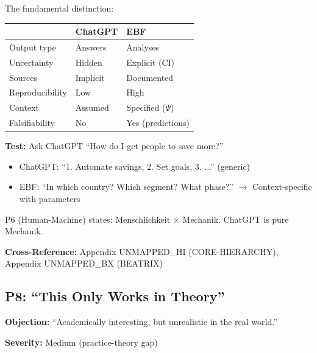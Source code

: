 \begin{axiom}
The fundamental distinction:

\begin{center}
\begin{tabular}{lll}
& \textbf{ChatGPT} & \textbf{EBF} \\
\midrule
Output type & Answers & Analyses \\
Uncertainty & Hidden & Explicit (CI) \\
Sources & Implicit & Documented \\
Reproducibility & Low & High \\
Context & Assumed & Specified ($\Psi$) \\
Falsifiability & No & Yes (predictions) \\
\end{tabular}
\end{center}

\textbf{Test:} Ask ChatGPT ``How do I get people to save more?''
\begin{itemize}[nosep]
    \item ChatGPT: ``1. Automate savings, 2. Set goals, 3. ...'' (generic)
    \item EBF: ``In which country? Which segment? What phase?'' $\rightarrow$ Context-specific with parameters
\end{itemize}

P6 (Human-Machine) states: Menschlichkeit $\times$ Mechanik. ChatGPT is pure Mechanik.
\end{axiom}

\textbf{Cross-Reference:} Appendix UNMAPPED_HI (CORE-HIERARCHY), Appendix UNMAPPED_BX (BEATRIX)

\subsection{P8: ``This Only Works in Theory''}
\label{sec:da-p8}

\begin{tcolorbox}[colback=gray!5!white, colframe=gray!75!black]
\textbf{Objection:} ``Academically interesting, but unrealistic in the real world.''

\textbf{Severity:} Medium (practice-theory gap)
\end{tcolorbox}

